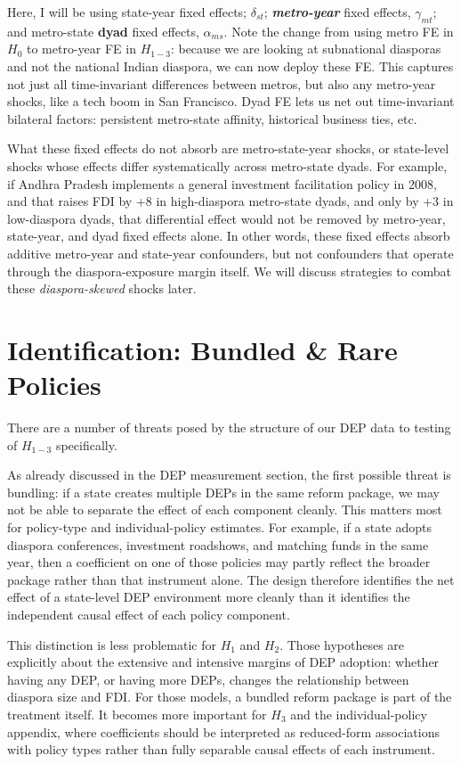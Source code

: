 \documentclass[doublespace,nopageskip]{UVAthesis}
\begin{document}
Here, I will be using state-year fixed effects; $\delta_{st}$; \textbf{\textit{metro-year}} fixed effects, $\gamma_{mt}$; and metro-state \textbf{dyad} fixed effects, $\alpha_{ms}$. Note the change from using metro FE in $H_0$ to metro-year FE in $H_{1-3}$: because we are looking at subnational diasporas and not the national Indian diaspora, we can now deploy these FE. This captures not just all time-invariant differences between metros, but also any metro-year shocks, like a tech boom in San Francisco. Dyad FE lets us net out time-invariant bilateral factors: persistent metro-state affinity, historical business ties, etc. 

What these fixed effects do not absorb are metro-state-year shocks, or state-level shocks whose effects differ systematically across metro-state dyads. For example, if Andhra Pradesh implements a general investment facilitation policy in 2008, and that raises FDI by +8 in high-diaspora metro-state dyads, and only by +3 in low-diaspora dyads, that differential effect would not be removed by metro-year, state-year, and dyad fixed effects alone. In other words, these fixed effects absorb additive metro-year and state-year confounders, but not confounders that operate through the diaspora-exposure margin itself. We will discuss strategies to combat these \textit{diaspora-skewed} shocks later.

\section{Identification: Bundled \& Rare Policies } \label{ss: bundled, rare policies}

There are a number of threats posed by the structure of our DEP data to testing of $H_{1-3}$ specifically.

As already discussed in the DEP measurement section, the first possible threat is bundling: if a state creates multiple DEPs in the same reform package, we may not be able to separate the effect of each component cleanly. This matters most for policy-type and individual-policy estimates. For example, if a state adopts diaspora conferences, investment roadshows, and matching funds in the same year, then a coefficient on one of those policies may partly reflect the broader package rather than that instrument alone. The design therefore identifies the net effect of a state-level DEP environment more cleanly than it identifies the independent causal effect of each policy component.

This distinction is less problematic for $H_1$ and $H_2$. Those hypotheses are explicitly about the extensive and intensive margins of DEP adoption: whether having any DEP, or having more DEPs, changes the relationship between diaspora size and FDI. For those models, a bundled reform package is part of the treatment itself. It becomes more important for $H_3$ and the individual-policy appendix, where coefficients should be interpreted as reduced-form associations with policy types rather than fully separable causal effects of each instrument.
\end{document}
